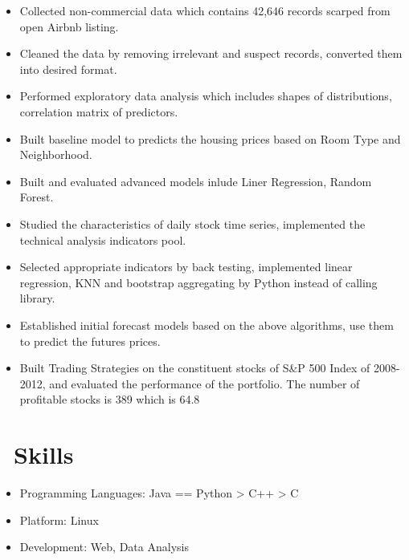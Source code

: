 \documentclass{resume}
\begin{document}
\begin{itemize}
  \item Collected non-commercial data which contains 42,646 records scarped from open Airbnb listing.
  \item Cleaned the data by removing irrelevant and suspect records, converted them into desired format.
  \item Performed exploratory data analysis which includes shapes of distributions, correlation matrix of predictors.
  \item Built baseline model to predicts the housing prices based on Room Type and Neighborhood.
  \item Built and evaluated advanced models inlude Liner Regression, Random Forest.
\end{itemize}

\begin{itemize}
  \item Studied the characteristics of daily stock time series, implemented the technical analysis indicators pool.
  \item Selected appropriate indicators by back testing, implemented linear regression, KNN and bootstrap aggregating by Python instead of calling library.
  \item Established initial forecast models based on the above algorithms, use them to predict the futures prices.
  \item Built Trading Strategies on the constituent stocks of S\&P 500 Index of 2008-2012, and evaluated the performance of the portfolio. The number of profitable stocks is 389 which is 64.8%
\end{itemize}


\section{\faCogs\ Skills}
\begin{itemize}[parsep=0.5ex]
  \item Programming Languages: Java == Python > C++ > C
  \item Platform: Linux
  \item Development: Web, Data Analysis
\end{itemize}
\end{document}
